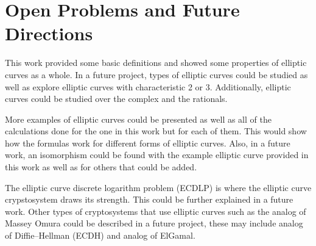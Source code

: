 \chapter{Open Problems and Future Directions}

\hspace{10mm} This work provided some basic definitions and showed some properties of elliptic curves as a whole. In a future project, types of elliptic curves could be studied as well as explore elliptic curves with characteristic 2 or 3. Additionally, elliptic curves could be studied over the complex and the rationals.

\hspace{10mm} More examples of elliptic curves could be presented as well as all of the calculations done for the one in this work but for each of them. This would show how the formulas work for different forms of elliptic curves. Also, in a future work, an isomorphism could be found with the example elliptic curve provided in this work as well as for others that could be added. 

\hspace{10mm} The elliptic curve discrete logarithm problem (ECDLP) is where the elliptic curve crypstosystem draws its strength. This could be further explained in a future work. Other types of cryptosystems that use elliptic curves such as the analog of Massey Omura could be described in a future project, these may include analog of Diffie–Hellman (ECDH) and analog of ElGamal. 